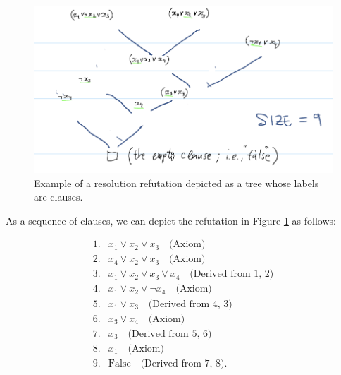 \begin{figure}[H]\label{fig:res-refutation}
\includegraphics{images/resolution-example.png}
\caption{Example of a resolution refutation depicted as a tree whose labels are clauses.}
\end{figure}
As a sequence of clauses, we can depict the refutation in Figure \ref{fig:res-refutation} as follows:


\[
\begin{array}{ll}
1. & x_1 \vee x_2 \vee x_3 \quad \text{(Axiom)} \\
2. & x_4 \vee x_2 \vee x_3 \quad \text{(Axiom)} \\
3. & x_1 \vee x_2 \vee x_3 \vee x_4 \quad \text{(Derived from 1, 2)} \\
4. & x_1 \vee x_2 \vee \neg x_4 \quad \text{(Axiom)} \\
5. & x_1 \vee x_3 \quad \text{(Derived from 4, 3)} \\
6. & x_3 \vee x_4 \quad \text{(Axiom)} \\
7. & x_3 \quad \text{(Derived from 5, 6)} \\
8. & x_1 \quad \text{(Axiom)} \\
9. & \text{False} \quad \text{(Derived from 7, 8).}
\end{array}
\]

% 

